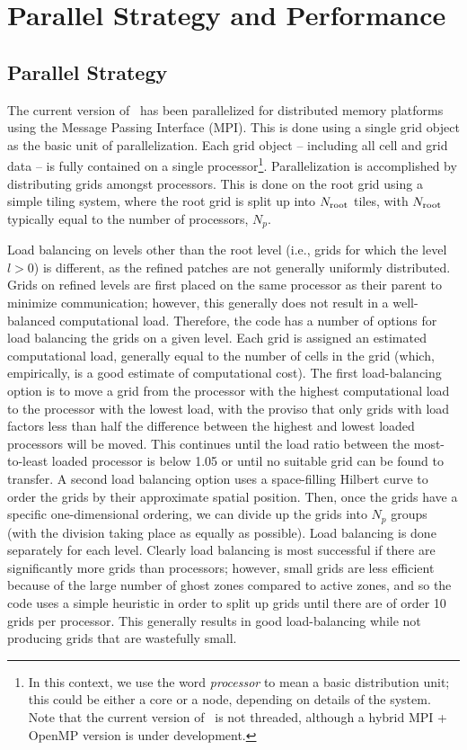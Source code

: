 \section{Parallel Strategy and Performance}
\label{sec.parallel}

\subsection{Parallel Strategy}

The current version of \enzo\ has been parallelized for distributed
memory platforms using the Message Passing Interface (MPI).  This is
done using a single grid object as the basic unit of parallelization.
Each grid object -- including all cell and grid data -- is fully
contained on a single processor\footnote{In this context, we use the
word {\it processor} to mean a basic distribution unit; this could be
either a core or a node, depending on details of the system.  Note
that the current version of \enzo\ is not threaded, although a hybrid
MPI + OpenMP version is under development.}.  Parallelization is
accomplished by distributing grids amongst processors.  This is done
on the root grid using a simple tiling system, where the root grid is
split up into $N_{\rm root}$ tiles, with $N_{\rm root}$ typically
equal to the number of processors, $N_p$.

Load balancing on levels other than the root level (i.e., grids for
which the level $l > 0$) is different, as the refined patches are not
generally uniformly distributed.  Grids on refined levels are first
placed on the same processor as their parent to minimize
communication; however, this generally does not result in a
well-balanced computational load.  Therefore, the code has a number of
options for load balancing the grids on a given level. Each grid is
assigned an estimated computational load, generally equal to the
number of cells in the grid (which, empirically, is a good estimate of
computational cost).  The first load-balancing option is to move a
grid from the processor with the highest computational load to the
processor with the lowest load, with the proviso that only grids with
load factors less than half the difference between the highest and
lowest loaded processors will be moved.  This continues until the load
ratio between the most-to-least loaded processor is below 1.05 or
until no suitable grid can be found to transfer.  A second load
balancing option uses a space-filling Hilbert curve to order the grids
by their approximate spatial position.  Then, once the grids have a
specific one-dimensional ordering, we can divide up the grids into
$N_p$ groups (with the division taking place as equally as possible).
Load balancing is done separately for each level.  Clearly load
balancing is most successful if there are significantly more grids
than processors; however, small grids are less efficient because of
the large number of ghost zones compared to active zones, and so the
code uses a simple heuristic in order to split up grids until there
are of order 10 grids per processor.  This generally results in good
load-balancing while not producing grids that are wastefully small.


